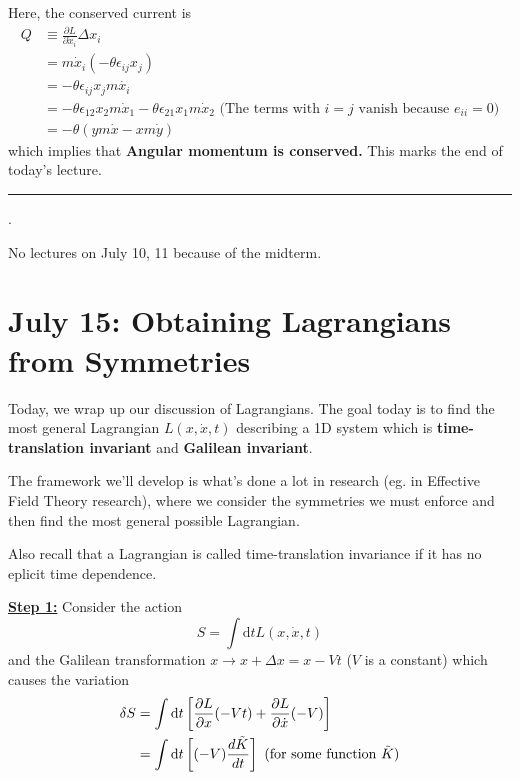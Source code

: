 \documentclass[11pt]{article}
\begin{document}
\vskip 0.5cm
Here, the conserved current is 
\begin{align*}
  Q &\equiv \frac{\partial L}{\partial \dot{x}_i} \Delta x_i \\
  &= m \dot{x}_i \left(-\theta \epsilon_{ij} x_{j}\right) \\
  &= -\theta \epsilon_{ij} x_j m\dot{x_i} \\
  &= -\theta \epsilon_{12} x_2 m\dot{x}_1 - \theta \epsilon_{21} x_1 m \dot{x}_2 \text{  (The terms with $i=j$ vanish because $e_{ii} = 0$)} \\
  &= -\theta(ym\dot{x} - xm\dot{y}) 
\end{align*}
which implies that \textbf{Angular momentum is conserved.} This marks the end of today's lecture.
\hrule

\vskip 1cm.
\begin{note}
{No lectures on July 10, 11 because of the midterm.}
\end{note}


\pagebreak
\section{July 15: Obtaining Lagrangians from Symmetries}

Today, we wrap up our discussion of Lagrangians. The goal today is to find the most general Lagrangian $L(x, \dot{x}, t)$ describing a 1D system which is \textbf{time-translation invariant} and \textbf{Galilean invariant}.


The framework we'll develop is what's done a lot in research (eg. in Effective Field Theory research), where we consider the symmetries we must enforce and then find the most general possible Lagrangian.

\vskip 0.5cm
Also recall that a Lagrangian is called time-translation invariance if it has no eplicit time dependence. 

\vskip 0.5cm
\textbf{\underline{Step 1:}} Consider the action
\[ S = \int \mathrm{d}t L(x, \dot{x}, t) \]
and the Galilean transformation $x \rightarrow x + \Delta x = x - Vt$ ($V$ is a constant) which causes the variation
\vskip 0.5cm
\begin{align*}
  \delta S &= \int \mathrm{d}t \left[ \frac{\partial L}{\partial x}(-Vt) + \frac{\partial L}{\partial \dot{x}}(-V) \right] \\
  &= \int \mathrm{d}t \left[ (-V)\frac{d \Tilde{K}}{dt} \right]  \text{ (for some function $\Tilde{K}$)} \\
\end{align*}
\end{document}
